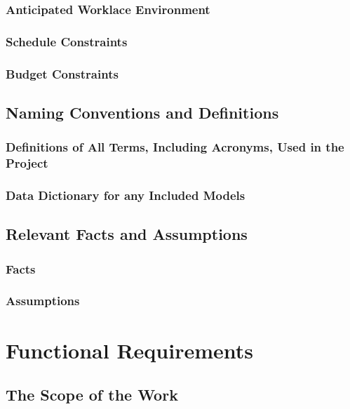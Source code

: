 \documentclass{scrreprt}
\begin{document}
\subsection{Anticipated Worklace Environment}

\subsection{Schedule Constraints}

\subsection{Budget Constraints}

\section{Naming Conventions and Definitions}

\subsection{Definitions of All Terms, Including Acronyms, Used in the Project}

\subsection{Data Dictionary for any Included Models}

\section{Relevant Facts and Assumptions}

\subsection{Facts}

\subsection{Assumptions}

\chapter{Functional Requirements}

\section{The Scope of the Work}
\end{document}
